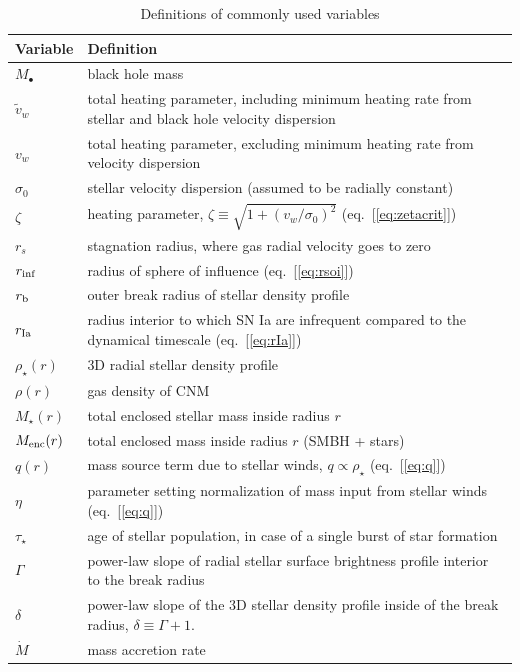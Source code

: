 \documentclass[usenatbib,fleqn]{mn2e}
\begin{document}
\begin{table}
\begin{threeparttable}
\begin{minipage}{18cm}
\caption{Definitions of commonly used variables}
\begin{tabular}{ll}
\hline
{Variable} & {Definition} \\
\hline
$M_{\bullet}$ & black hole mass \\
$\tilde{v}_{w}$ & total heating parameter, including minimum heating
rate from stellar and black hole velocity dispersion \\
$v_{w}$ & total heating parameter, excluding minimum heating rate from
velocity dispersion \\
$\sigma_0$ & stellar velocity dispersion (assumed to be radially constant)\\
$\zeta$ & heating parameter, $\zeta \equiv \sqrt{1 + (v_w/\sigma_0)^2}$ (eq.~[\ref{eq:zetacrit}])\\
$r_{s}$ & stagnation radius, where gas radial velocity goes to zero \\
$r_{\rm inf}$ & radius of sphere of influence (eq.~[\ref{eq:rsoi}]) \\
$r_{\rm b}$ & outer break radius of stellar density profile \\ 
$r_{\rm Ia}$ & radius interior to which SN Ia are infrequent compared to the dynamical timescale (eq.~[\ref{eq:rIa}]) \\ 
$\rho_{\star}(r)$ & 3D radial stellar density profile \\
$\rho(r)$ & gas density of CNM \\
$M_{\star}(r)$ & total enclosed stellar mass inside radius $r$ \\
$M_{\rm enc}(r)$ & total enclosed mass inside radius $r$ (SMBH + stars) \\
$q(r)$ & mass source term due to stellar winds, $q \propto \rho_{\star}$ (eq.~[\ref{eq:q}]) \\
$\eta$ & parameter setting normalization of mass input from stellar winds (eq.~[\ref{eq:q}]) \\
$\tau_{\star}$ & age of stellar population, in case of a single burst of star formation \\
$\Gamma$ & power-law slope of radial stellar surface brightness
profile interior to the break radius \\
$\delta$ & power-law slope of the 3D stellar density profile inside of
the break radius, $\delta \equiv \Gamma+1$.\\
$\dot{M}$ & mass accretion rate  \\

\end{tabular}
\end{minipage}
\end{threeparttable}
\end{table}
\end{document}
